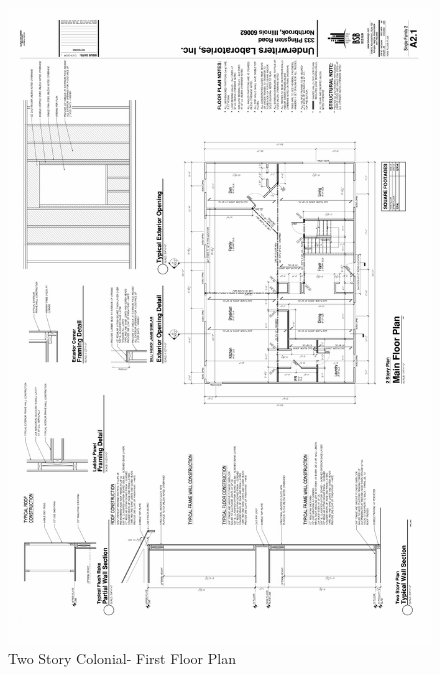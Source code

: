 \documentclass{article}
\begin{document}
\begin{appendices}
\begin{figure}[H]
	\includegraphics[width=6.25in]{0_Images/Construction_Drawings/2_Story_Floor_Plan.pdf}
	\caption{Two Story Colonial- First Floor Plan}
\end{figure}

\clearpage


\end{appendices}
\end{document}
